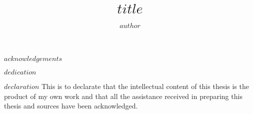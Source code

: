 \documentclass[
$if(draft)$
  draft,
$endif$
$if(fontsize)$
  $fontsize$,
$endif$
$if(margins)$
  $margins$,
$endif$
$if(spacing)$
  $spacing$,
$endif$
$if(clearpagestyle)$
  $clearpagestyle$,
$endif$
$if(notespacing)$
  $notespacing$,
$endif$
$for(classoption)$
  $classoption$$sep$,
$endfor$
]{templates/ut-thesis}
\author{$author$}
\title{$title$}
\begin{document}
\begin{preliminary}

\maketitle

\clearpage
\thispagestyle{empty}
\mbox{}
\newpage


\begin{acknowledgements}
$acknowledgements$ %
\end{acknowledgements}


\begin{dedication}
$dedication$ %
\end{dedication}


\begin{declaration}
$declaration$ %
This is to declarate that the intellectual content of this thesis is the product of my own work and that all the assistance received in preparing this thesis and sources have been acknowledged.
\end{declaration}



\end{preliminary}
\end{document}
